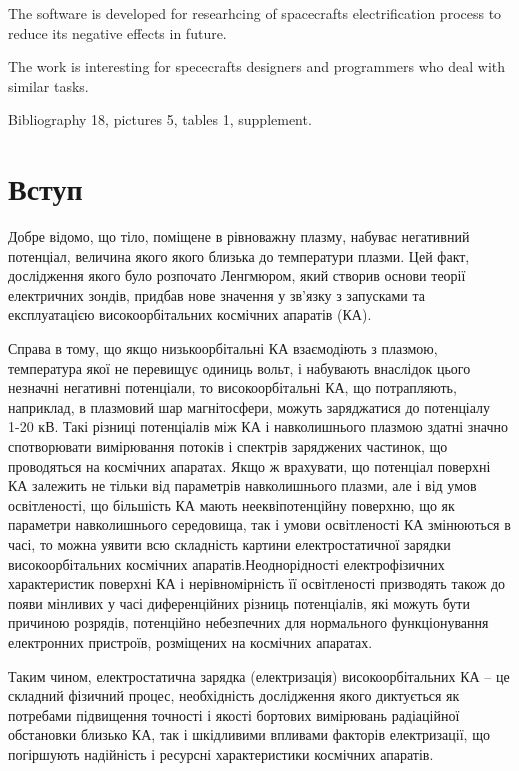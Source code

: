 \documentclass[a4paper,12pt]{article}
\begin{document}
The software is developed for researhcing of spacecrafts electrification process to reduce its negative effects in future.

The work is interesting for spececrafts designers and programmers who deal with similar tasks.

Bibliography 18, pictures 5, tables 1, supplement.

\newpage

\tableofcontents

\newpage

\section*{Вступ}
Добре відомо, що тіло, поміщене в рівноважну плазму, набуває негативний потенціал, величина якого якого близька до температури плазми. Цей факт, дослідження якого було розпочато Ленгмюром, який створив основи теорії електричних зондів, придбав нове значення у зв'язку з запусками та експлуатацією високоорбітальних космічних апаратів (КА).

Справа в тому, що якщо низькоорбітальні КА взаємодіють з плазмою, температура якої не перевищує одиниць вольт, і набувають внаслідок цього незначні негативні потенціали, то високоорбітальні КА, що потрапляють, наприклад, в плазмовий шар магнітосфери, можуть заряджатися до потенціалу ~ 1-20 кВ. Такі різниці потенціалів між КА і навколишнього плазмою здатні значно спотворювати вимірювання потоків і спектрів заряджених частинок, що проводяться на космічних апаратах. Якщо ж врахувати, що потенціал поверхні КА залежить не тільки від параметрів навколишнього плазми, але і від умов освітленості, що більшість КА мають нееквіпотенційну поверхню, що як параметри навколишнього середовища, так і умови освітленості КА змінюються в часі, то можна уявити всю складність картини електростатичної зарядки високоорбітальних космічних апаратів.Неоднорідності електрофізичних характеристик поверхні КА і нерівномірність її освітленості призводять також до появи мінливих у часі диференційних різниць потенціалів, які можуть бути причиною розрядів, потенційно небезпечних для нормального функціонування електронних пристроїв, розміщених на космічних апаратах.

Таким чином, електростатична зарядка (електризація) високоорбітальних КА -- це складний фізичний процес, необхідність дослідження якого диктується як потребами підвищення точності і якості бортових вимірювань радіаційної обстановки близько КА, так і шкідливими впливами факторів електризації, що погіршують надійність і ресурсні характеристики космічних апаратів.
\end{document}
